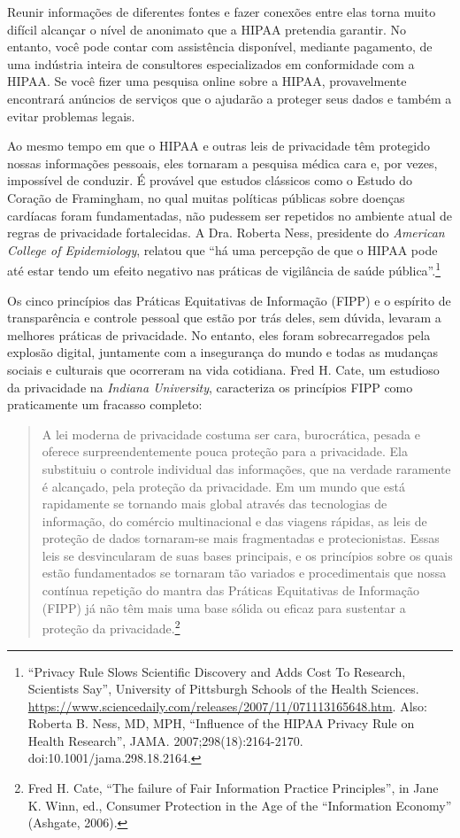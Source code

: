 \documentclass{book}
\newcommand{\ingles}[1]{\textit{#1}}
\begin{document}
Reunir informações de diferentes fontes e fazer conexões entre elas torna muito
difícil alcançar o nível de anonimato que a HIPAA pretendia garantir. No entanto,
você pode contar com assistência disponível, mediante pagamento, de uma indústria
inteira de consultores especializados em conformidade com a HIPAA. Se você fizer
uma pesquisa online sobre a HIPAA, provavelmente encontrará anúncios de serviços
que o ajudarão a proteger seus dados e também a evitar problemas legais.

Ao mesmo tempo em que o HIPAA e outras leis de privacidade têm protegido nossas
informações pessoais, eles tornaram a pesquisa médica cara e, por vezes,
impossível de conduzir. É provável que estudos clássicos como o Estudo do Coração
de Framingham, no qual muitas políticas públicas sobre doenças cardíacas foram
fundamentadas, não pudessem ser repetidos no ambiente atual de regras de
privacidade fortalecidas. A Dra. Roberta Ness, presidente do \ingles{American
College of Epidemiology}, relatou que ``há uma percepção de que o HIPAA pode
até estar tendo um efeito negativo nas práticas de vigilância de saúde
pública''.\footnote{``Privacy Rule Slows Scientific Discovery and Adds Cost
To Research, Scientists Say'', University of Pittsburgh Schools of the Health
Sciences.
\url{https://www.sciencedaily.com/releases/2007/11/071113165648.htm}.
Also: Roberta B. Ness, MD, MPH, ``Influence of the HIPAA Privacy Rule on Health
Research'', JAMA. 2007;298(18):2164-2170. doi:10.1001/jama.298.18.2164.}

Os cinco princípios das Práticas Equitativas de Informação (FIPP) e o espírito
de transparência e controle pessoal que estão por trás deles, sem dúvida, levaram
a melhores práticas de privacidade. No entanto, eles foram sobrecarregados pela
explosão digital, juntamente com a insegurança do mundo e todas as mudanças sociais
e culturais que ocorreram na vida cotidiana. Fred H. Cate, um estudioso da
privacidade na \ingles{Indiana University}, caracteriza os princípios FIPP como
praticamente um fracasso completo:

\begin{quote}
A lei moderna de privacidade costuma ser cara, burocrática, pesada e oferece
surpreendentemente pouca proteção para a privacidade. Ela substituiu o controle
individual das informações, que na verdade raramente é alcançado, pela proteção
da privacidade. Em um mundo que está rapidamente se tornando mais global através
das tecnologias de informação, do comércio multinacional e das viagens rápidas,
as leis de proteção de dados tornaram-se mais fragmentadas e protecionistas.
Essas leis se desvincularam de suas bases principais, e os princípios sobre os
quais estão fundamentados se tornaram tão variados e procedimentais que nossa
contínua repetição do mantra das Práticas Equitativas de Informação (FIPP) já
não têm mais uma base sólida ou eficaz para sustentar a proteção da
privacidade.\footnote{Fred H. Cate, ``The failure of Fair Information Practice
Principles'', in Jane K. Winn, ed., Consumer Protection in the Age of the 
``Information Economy'' (Ashgate, 2006).}
\end{quote}
\end{document}
